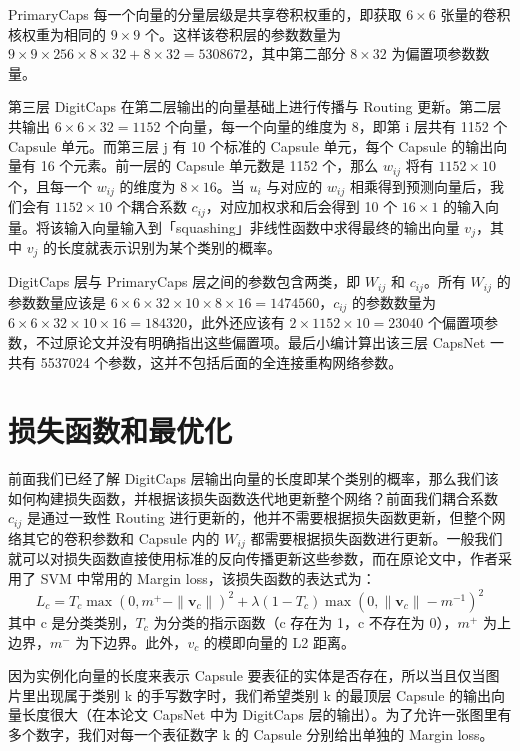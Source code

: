 PrimaryCaps 每一个向量的分量层级是共享卷积权重的，即获取 $6\times6$ 张量的卷积核权重为相同的 $9\times9$ 个。这样该卷积层的参数数量为 $9\times9\times256\times8\times32+8\times32=5308672$，其中第二部分 $8\times32$ 为偏置项参数数量。

第三层 DigitCaps 在第二层输出的向量基础上进行传播与 Routing 更新。第二层共输出 $6\times6\times32=1152$ 个向量，每一个向量的维度为 8，即第 i 层共有 1152 个 Capsule 单元。而第三层 j 有 10 个标准的 Capsule 单元，每个 Capsule 的输出向量有 16 个元素。前一层的 Capsule 单元数是 1152 个，那么 $w_{ij}$ 将有 $1152\times10$ 个，且每一个 $w_{ij}$ 的维度为 $8\times16$。当 $u_i$ 与对应的 $w_{ij}$ 相乘得到预测向量后，我们会有 $1152\times10$ 个耦合系数 $c_{ij}$，对应加权求和后会得到 10 个 $16\times1$ 的输入向量。将该输入向量输入到「squashing」非线性函数中求得最终的输出向量 $v_j$，其中 $v_j$ 的长度就表示识别为某个类别的概率。

DigitCaps 层与 PrimaryCaps 层之间的参数包含两类，即 $W_{ij}$ 和 $c_{ij}$。所有 $W_{ij}$ 的参数数量应该是 $6\times6\times32\times10\times8\times16=1474560$，$c_{ij}$ 的参数数量为 $6\times6\times32\times10\times16=184320$，此外还应该有 $2\times1152\times10=23040$ 个偏置项参数，不过原论文并没有明确指出这些偏置项。最后小编计算出该三层 CapsNet 一共有 5537024 个参数，这并不包括后面的全连接重构网络参数。
\section{损失函数和最优化}
前面我们已经了解 DigitCaps 层输出向量的长度即某个类别的概率，那么我们该如何构建损失函数，并根据该损失函数迭代地更新整个网络？前面我们耦合系数 $c_{ij}$ 是通过一致性 Routing 进行更新的，他并不需要根据损失函数更新，但整个网络其它的卷积参数和 Capsule 内的 $W_{ij}$ 都需要根据损失函数进行更新。一般我们就可以对损失函数直接使用标准的反向传播更新这些参数，而在原论文中，作者采用了 SVM 中常用的 Margin loss，该损失函数的表达式为：
\begin{equation}
	L_c = T_c\max(0,m^{+}-\|\mathbf{v}_c\|)^2+\lambda(1-T_c)\max(0,\|\mathbf{v}_c\|-m^{-1})^2
\end{equation}
其中 c 是分类类别，$T_c$ 为分类的指示函数（c 存在为 1，c 不存在为 0），$m^{+}$ 为上边界，$m^{-}$ 为下边界。此外，$v_c$ 的模即向量的 L2 距离。

因为实例化向量的长度来表示 Capsule 要表征的实体是否存在，所以当且仅当图片里出现属于类别 k 的手写数字时，我们希望类别 k 的最顶层 Capsule 的输出向量长度很大（在本论文 CapsNet 中为 DigitCaps 层的输出）。为了允许一张图里有多个数字，我们对每一个表征数字 k 的 Capsule 分别给出单独的 Margin loss。

